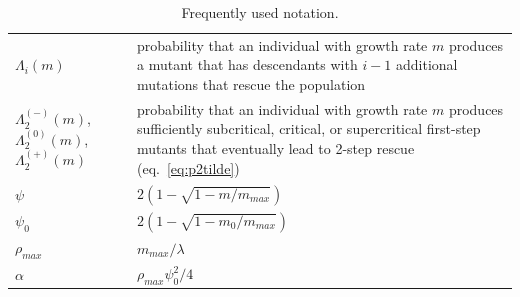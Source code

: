 \documentclass[9pt,twocolumn,twoside,lineno]{gsajnl}
\begin{document}
\begin{table}[!h]
\begin{tabular}{p{1.5cm} p{6.5cm}}
$\Lambda_i(m)$ & probability that an individual with growth rate $m$ produces a mutant that has descendants with $i-1$ additional mutations that rescue the population\\
$\Lambda_2^{(-)}(m)$, $\Lambda_2^{(0)}(m)$, $\Lambda_2^{(+)}(m)$ & probability that an individual with growth rate $m$ produces sufficiently subcritical, critical, or supercritical first-step mutants that eventually lead to 2-step rescue (eq.\ \ref{eq:p2tilde}) \\
$\psi$ & $2(1-\sqrt{1-m/m_{max}})$ \\
$\psi_0$ & $2(1-\sqrt{1-m_0/m_{max}})$\\
$\rho_{max}$ & $m_{max}/\lambda$\\
$\alpha$ & $\rho_{max} \psi_0^2/4$\\
\hline
\end{tabular}
\caption{Frequently used notation.}
\label{tab:notation}   
\end{table}
\end{document}

